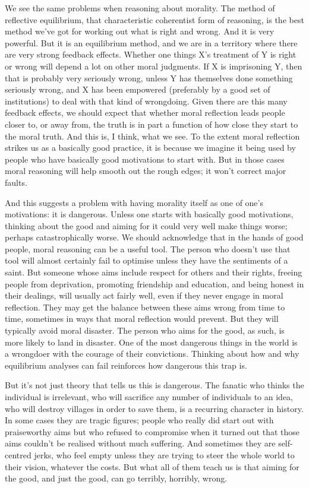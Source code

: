 We see the same problems when reasoning about morality. The method of reflective equilibrium, that characteristic coherentist form of reasoning, is the best method we've got for working out what is right and wrong. And it is very powerful. But it is an equilibrium method, and we are in a territory where there are very strong feedback effects. Whether one things X's treatment of Y is right or wrong will depend a lot on other moral judgments. If X is imprisoning Y, then that is probably very seriously wrong, unless Y has themselves done something seriously wrong, and X has been empowered (preferably by a good set of institutions) to deal with that kind of wrongdoing. Given there are this many feedback effects, we should expect that whether moral reflection leads people closer to, or away from, the truth is in part a function of how close they start to the moral truth. And this is, I think, what we see. To the extent moral reflection strikes us as a basically good practice, it is because we imagine it being used by people who have basically good motivations to start with. But in those cases moral reasoning will help smooth out the rough edges; it won't correct major faults.

And this suggests a problem with having morality itself as one of one's motivations: it is dangerous. Unless one starts with basically good motivations, thinking about the good and aiming for it could very well make things worse; perhaps catastrophically worse. We should acknowledge that in the hands of good people, moral reasoning can be a useful tool. The person who doesn't use that tool will almost certainly fail to optimise unless they have the sentiments of a saint. But someone whose aims include respect for others and their rights, freeing people from deprivation, promoting friendship and education, and being honest in their dealings, will usually act fairly well, even if they never engage in moral reflection. They may get the balance between these aims wrong from time to time, sometimes in ways that moral reflection would prevent. But they will typically avoid moral disaster. The person who aims for the good, as such, is more likely to land in disaster. One of the most dangerous things in the world is a wrongdoer with the courage of their convictions. Thinking about how and why equilibrium analyses can fail reinforces how dangerous this trap is.

But it's not just theory that tells us this is dangerous. The fanatic who thinks the individual is irrelevant, who will sacrifice any number of individuals to an idea, who will destroy villages in order to save them, is a recurring character in history. In some cases they are tragic figures; people who really did start out with praiseworthy aims but who refused to compromise when it turned out that those aims couldn't be realised without much suffering. And sometimes they are self-centred jerks, who feel empty unless they are trying to steer the whole world to their vision, whatever the costs. But what all of them teach us is that aiming for the good, and just the good, can go terribly, horribly, wrong.

